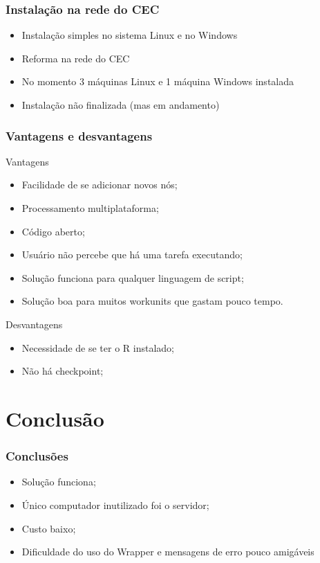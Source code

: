 \documentclass{beamer}
\begin{document}
\begin{frame}
  \frametitle{Instalação na rede do CEC}
  \begin{itemize}
    \item Instalação simples no sistema Linux e no Windows
    \item Reforma na rede do CEC
    \item No momento 3 máquinas Linux e 1 máquina Windows instalada
    \item Instalação não finalizada (mas em andamento)
  \end{itemize}
\end{frame}

\begin{frame}
  \frametitle{Vantagens e desvantagens}
  \begin{block}{Vantagens}
  \begin{itemize}
    \item Facilidade de se adicionar novos nós;
    \item Processamento multiplataforma;
    \item Código aberto;
    \item Usuário não percebe que há uma tarefa executando;
    \item Solução funciona para qualquer linguagem de script;
    \item Solução boa para muitos workunits que gastam pouco tempo.
  \end{itemize}
  \end{block}
  \begin{block}{Desvantagens}
  \begin{itemize}
    \item Necessidade de se ter o R instalado;
    \item Não há checkpoint;
  \end{itemize}
  \end{block}
\end{frame}


\section{Conclusão}

\begin{frame}
  \frametitle{Conclusões}
  \begin{itemize}
    \item Solução funciona;
    \item Único computador inutilizado foi o servidor;
    \item Custo baixo;
    \item Dificuldade do uso do Wrapper e mensagens de erro pouco amigáveis 
  \end{itemize}
\end{frame}
\end{document}
